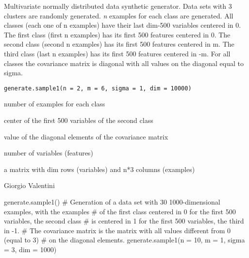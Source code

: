 \documentclass{article}
\begin{document}
\begin{Description}\relax
Multivariate normally  distributed data synthetic generator.
Data sets with 3 clusters are randomly generated.
\emph{n} examples for each class are generated.
All classes (each one of n examples) have their last dim-500 variables centered in 0.
The first class (first n examples) has its first 500  features centered in 0.
The second class (second n examples) has its first 500 features centered in  m.
The third class (last n examples) has its first 500 features centered in  -m.
For all classes the covariance matrix is diagonal with all values on the diagonal equal to sigma.
\end{Description}
\begin{Usage}
\begin{verbatim}
generate.sample1(n = 2, m = 6, sigma = 1, dim = 10000)
\end{verbatim}
\end{Usage}
\begin{Arguments}
\begin{ldescription}
\item[\code{n}] number of examples for each class 
\item[\code{m}] center of the first 500 variables of the second class 
\item[\code{sigma}] value of the diagonal elements of the covariance matrix  
\item[\code{dim}] number of variables (features) 
\end{ldescription}
\end{Arguments}
\begin{Value}
a matrix with dim rows (variables) and n*3 columns (examples)
\end{Value}
\begin{Author}\relax
Giorgio Valentini 
\end{Author}
\begin{Examples}
\begin{ExampleCode}

generate.sample1()
# Generation of a data set with 30 1000-dimensional examples, with the examples 
# of the first class  centered in 0 for the first 500 variables, the second class 
# is centered in 1 for the first 500 variables, the third in -1.  
# The covariance matrix is the matrix with all  values different from 0 (equal to 3)
# on the diagonal elements.
generate.sample1(n = 10, m = 1, sigma = 3, dim = 1000)

\end{ExampleCode}
\end{Examples}
\end{document}
